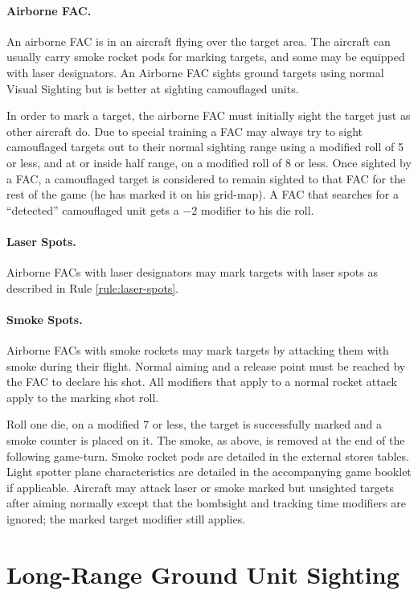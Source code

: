 \begin{advancedrules}
\paragraph{Airborne FAC.} An airborne FAC is in an aircraft flying over the target area. The aircraft can usually carry smoke rocket pods for marking targets, and some may be equipped with laser designators. An Airborne FAC sights ground targets using normal Visual Sighting but is better at sighting camouflaged units.

In order to mark a target, the airborne FAC must initially sight the target just as other aircraft do. Due to special training a FAC may always try to sight camouflaged targets out to their normal sighting range using a modified roll of 5 or less, and at or inside half range, on a modified roll of 8 or less. Once sighted by a FAC, a camouflaged target is considered to remain sighted to that FAC for the rest of the game (he has marked it on his grid-map). A FAC that searches for a “detected” camouflaged unit gets a $-2$ modifier to his die roll.

\paragraph{Laser Spots.} Airborne FACs with laser designators may mark targets with laser spots as described in Rule \ref{rule:laser-spots}.

\paragraph{Smoke Spots.} Airborne FACs with smoke rockets may mark targets by attacking them with smoke during their flight. Normal aiming and a release point must be reached by the FAC to declare his shot. All modifiers that apply to a normal rocket attack apply to the marking shot roll.

Roll one die, on a modified 7 or less, the target is successfully marked and a smoke counter is placed on it. The smoke, as above, is removed at the end of the following game-turn. Smoke rocket pods are detailed in the external stores tables. Light spotter plane characteristics are detailed in the accompanying game booklet if applicable. Aircraft may attack laser or smoke marked but unsighted targets after aiming normally except that the bombsight and tracking time modifiers are ignored; the marked target modifier still applies.

\section{Long-Range Ground Unit Sighting}


\end{advancedrules}

